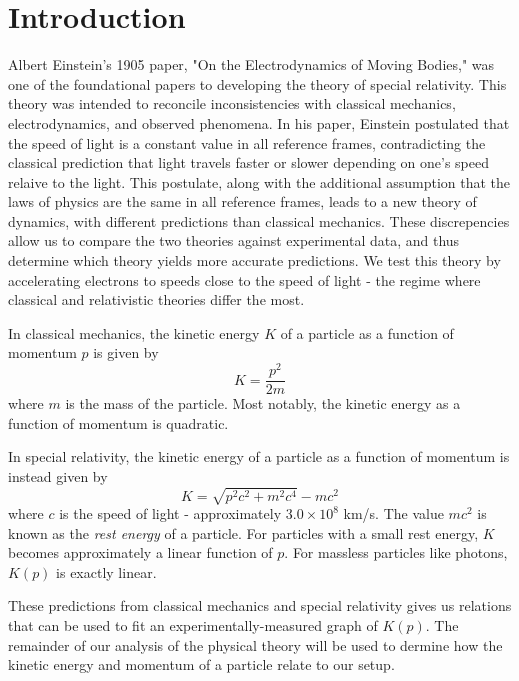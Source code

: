 \section{Introduction}
Albert Einstein's 1905 paper, "On the Electrodynamics of Moving Bodies," was one of the foundational papers to developing the theory of special relativity. This theory was intended to reconcile inconsistencies with classical mechanics, electrodynamics, and observed phenomena. In his paper, Einstein postulated that the speed of light is a constant value in all reference frames, contradicting the classical prediction that light travels faster or slower depending on one's speed relaive to the light. This postulate, along with the additional assumption that the laws of physics are the same in all reference frames, leads to a new theory of dynamics, with different predictions than classical mechanics. These discrepencies allow us to compare the two theories against experimental data, and thus determine which theory yields more accurate predictions. We test this theory by accelerating electrons to speeds close to the speed of light - the regime where classical and relativistic theories differ the most.

In classical mechanics, the kinetic energy $K$ of a particle as a function of momentum $p$ is given by
\begin{equation}
  K = \frac{p^2}{2m}
\end{equation}
where $m$ is the mass of the particle. Most notably, the kinetic energy as a function of momentum is quadratic.

In special relativity, the kinetic energy of a particle as a function of momentum is instead given by
\begin{equation}
  K = \sqrt{p^2 c^2 + m^2c^4} - mc^2
\end{equation}
where $c$ is the speed of light - approximately $3.0 \times 10^{8}$ km/s. The value $mc^2$ is known as the \textit{rest energy} of a particle. For particles with a small rest energy, $K$ becomes approximately a linear function of $p$. For massless particles like photons, $K(p)$ is exactly linear. 

These predictions from classical mechanics and special relativity gives us relations that can be used to fit an experimentally-measured graph of $K(p)$. The remainder of our analysis of the physical theory will be used to dermine how the kinetic energy and momentum of a particle relate to our setup.

